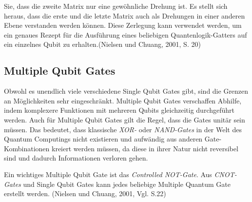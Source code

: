 \glqqBeachten Sie, dass die zweite Matrix nur eine gewöhnliche Drehung ist. Es stellt sich heraus, dass die erste und die letzte Matrix auch als Drehungen in einer anderen Ebene verstanden werden können. Diese Zerlegung kann verwendet werden, um ein genaues Rezept für die Ausführung eines beliebigen Quantenlogik-Gatters auf ein einzelnes Qubit zu erhalten.\grqq (Nielsen und Chuang, 2001, S. 20)

\newline \newline
{}



\newline \newline
\subsection{Multiple Qubit Gates} \newline

Obwohl es unendlich viele verschiedene Single Qubit Gates gibt, sind die Grenzen an Möglichkeiten sehr eingeschränkt. 
Multiple Qubit Gates verschaffen Abhilfe, indem komplexere Funktionen mit mehreren Qubits gleichzeitig durchgeführt werden. \newline
Auch für Multiple Qubit Gates gilt die Regel, dass die Gates unitär sein müssen. Das bedeutet, dass klassische \textit{XOR-} oder \textit{NAND-Gates} in der Welt des Quantum Computings nicht existieren und aufwändig aus anderen Gate-Kombinationen kreiert werden müssen, da diese in ihrer Natur nicht reversibel sind und dadurch Informationen verloren gehen. \newline \newline

Ein wichtiges Multiple Qubit Gate ist das \textit{Controlled NOT-Gate}. Aus \textit{CNOT-Gates} und Single Qubit Gates kann jedes beliebige Multiple Quantum Gate erstellt werden. (Nielsen und Chuang, 2001, Vgl. S.22) \newline

